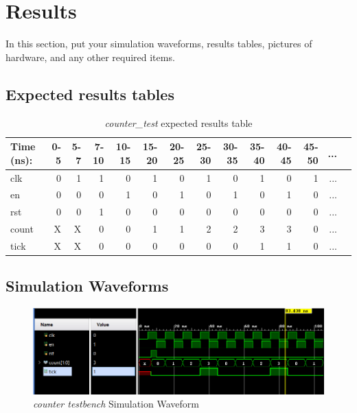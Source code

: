 \documentclass[11pt]{article}
\begin{document}
\section*{Results}

In this section, put your simulation waveforms, results tables, pictures of hardware, and any other required items.

  


\subsection*{Expected results tables}

\begin{table}[ht]\centering
	\caption{\textit{counter\_test} expected results table}
	\label{ALU:tbl:alu_ERT}\medskip
	\begin{tabular}{l|rrrrrrrrrrrrr}
		Time (ns): & 0-5 & 5-7 & 7-10 & 10-15 & 15-20 & 20-25 & 25-30 & 30-35 & 35-40 & 40-45 & 45-50 &...\\
		\midrule
		clk & 0  & 1 & 1 & 0 & 1 & 0 & 1 & 0 & 1 & 0 & 1 & ... \\
		en & 0 & 0 & 0 & 1 & 0 & 1 & 0 & 1 & 0 & 1 & 0 & ...\\
		rst & 0 & 0 & 1& 0 & 0 & 0 & 0 & 0 & 0 & 0 & 0 & ... \\
		\midrule
		count & X & X & 0 & 0  & 1 & 1 & 2 & 2 & 3 & 3 & 0 & ... \\
		tick & X & X & 0 & 0 & 0 & 0 & 0 & 0 & 1 & 1 & 0& ... \\
		\bottomrule
	\end{tabular}
\end{table}

\subsection*{Simulation Waveforms}
\begin{figure}[ht]\centering
	\includegraphics[width=1.1\textwidth]{counter_test}
	\caption{\textit{counter testbench} Simulation Waveform}
	\label{fig:sim_with_table}
\end{figure}
\end{document}
